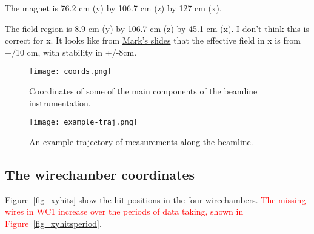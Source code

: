 The magnet is 76.2 cm (y) by 106.7 cm (z) by 127 cm (x).

The field region is 8.9 cm (y) by 106.7 cm (z) by 45.1 cm (x). I don't think this is correct for x. It looks like from \href{https://nova-docdb.fnal.gov/cgi-bin/sso/RetrieveFile?docid=46939&filename=testbeam-analysis-bfield.pdf&version=1}{Mark's slides} that the effective field in x is from +/10 cm, with stability in +/-8cm.






\begin{figure}[h]	   
 \centering
        	\texttt{[image: coords.png]}	 
   \caption[short]{Coordinates of some of the main components of the beamline instrumentation.}
   \label{fig_coords}
  \end{figure}
  
    \begin{figure}[h]	   
 \centering
        	\texttt{[image: example-traj.png]}	 
   \caption[short]{An example trajectory of measurements along the beamline.}
   \label{fig_traj}
  \end{figure}
  
  
\subsection{The wirechamber coordinates}

Figure~\ref{fig_xyhits} show the hit positions in the four wirechambers. \textcolor{red}{The missing wires in WC1 increase over the periods of data taking, shown in Figure~\ref{fig_xyhitsperiod}}.

